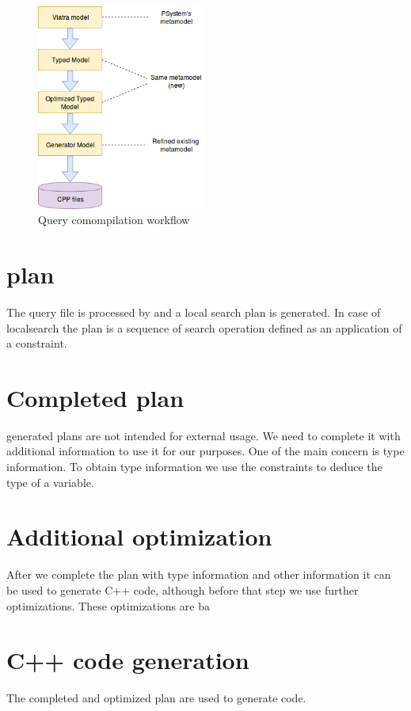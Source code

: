 \begin{figure}[h]
	\begin{center}
		\includegraphics[width=0.5\textwidth]{figures/workflow.png}
		\caption{Query comompilation workflow}
		\label{figure:query-compile-workflow}
	\end{center}
\end{figure}


\section{\viatra{} plan}

The query file is processed by \viatra{} and a local search plan is generated. In case of localsearch the plan is a sequence of search operation defined as an application of a constraint.


\section{Completed plan}

\viatra{} generated plans are not intended for external usage. We need to complete it with additional information to use it for our purposes. One of the main concern is type information. To obtain type information we use the constraints to deduce the type of a variable. 


\section{Additional optimization}

After we complete the plan with type information and other information it can be used to generate C++ code, although before that step we use further optimizations. These optimizations are ba

\section{C++ code generation}

The completed and optimized plan are used to generate \cpp{} code.










